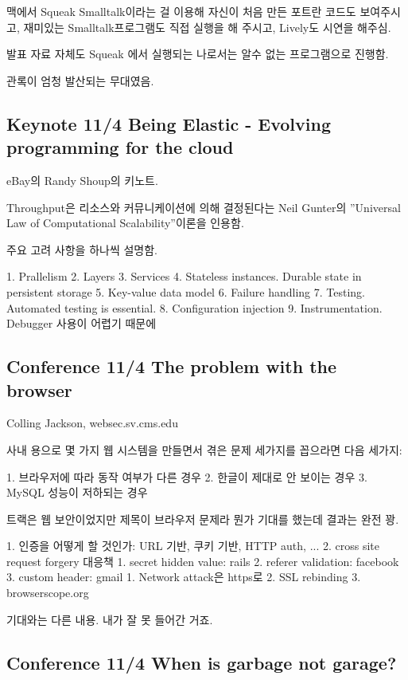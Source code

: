 \documentclass[a4paper]{article}
\begin{document}
맥에서 Squeak Smalltalk이라는 걸 이용해 자신이 처음 만든 포트란 코드도 보여주시고, 재미있는 Smalltalk프로그램도 직접 실행을 해 주시고, Lively도 시연을 해주심.
 
발표 자료 자체도 Squeak 에서 실행되는 나로서는 알수 없는 프로그램으로 진행함.
 
관록이 엄청 발산되는 무대였음. 
 
\subsection{Keynote 11/4 Being Elastic - Evolving programming for the cloud}
 
eBay의 Randy Shoup의 키노트.
 
Throughput은 리소스와 커뮤니케이션에 의해 결정된다는 Neil Gunter의 ”Universal Law of Computational Scalability”이론을 인용함. 
 
주요 고려 사항을 하나씩 설명함.
 
1. Prallelism
2. Layers
3. Services
4. Stateless instances. Durable state in persistent storage
5. Key-value data model
6. Failure handling
7. Testing. Automated testing is essential.
8. Configuration injection
9. Instrumentation. Debugger 사용이 어렵기 때문에
 
\subsection{Conference 11/4 The problem with the browser}
 
Colling Jackson, websec.sv.cms.edu
 
사내 용으로 몇 가지 웹 시스템을 만들면서 겪은 문제 세가지를 꼽으라면 다음 세가지:
 
1. 브라우저에 따라 동작 여부가 다른 경우
2. 한글이 제대로 안 보이는 경우
3. MySQL 성능이 저하되는 경우
 
트랙은 웹 보안이었지만 제목이 브라우저 문제라 뭔가 기대를 했는데 결과는 완전 꽝.
 
1. 인증을 어떻게 할 것인가: URL 기반, 쿠키 기반, HTTP auth, ...
2. cross site request forgery 대응책
1. secret hidden value: rails
2. referer validation: facebook
3. custom header: gmail
1. Network  attack은 https로 
2. SSL rebinding
3. browserscope.org 
 
기대와는 다른 내용. 내가 잘 못 들어간 거죠.
 
\subsection{Conference 11/4 When is garbage not garage?}
 
\end{document}
